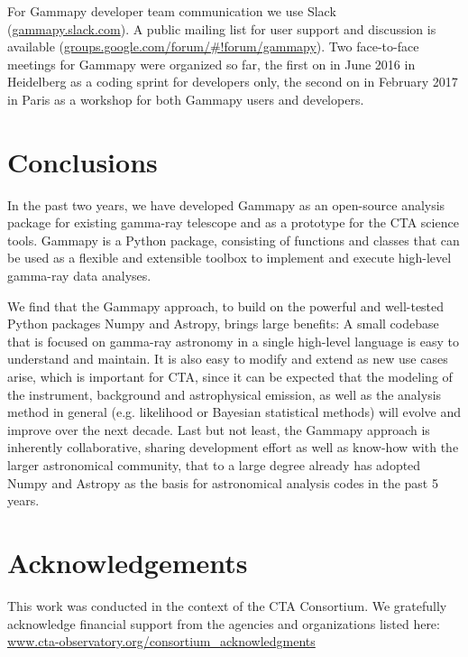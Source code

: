 \documentclass{PoS}
\newcommand{\urlGammapySlack}{\href{https://gammapy.slack.com}{gammapy.slack.com}}
\newcommand{\urlGammapyForum}{\href{https://groups.google.com/forum/\#!forum/gammapy}{groups.google.com/forum/\#!forum/gammapy}}
\newcommand{\urlCtaAck}{\href{http://www.cta-observatory.org/consortium_acknowledgments}{www.cta-observatory.org/consortium\_acknowledgments}}
\begin{document}
For Gammapy developer team communication we use Slack (\urlGammapySlack). A
public mailing list for user support and discussion is available
(\urlGammapyForum). Two face-to-face meetings for Gammapy were organized so far,
the first on in June 2016 in Heidelberg as a coding sprint for developers only,
the second on in February 2017 in Paris as a workshop for both Gammapy users and
developers.


\section{Conclusions}
\label{sec:conclusions}

In the past two years, we have developed Gammapy as an open-source analysis
package for existing gamma-ray telescope and as a prototype for the CTA science
tools. Gammapy is a Python package, consisting of functions and classes that can
be used as a flexible and extensible toolbox to implement and execute high-level
gamma-ray data analyses.

We find that the Gammapy approach, to build on the powerful and well-tested
Python packages Numpy and Astropy, brings large benefits: A small codebase that
is focused on gamma-ray astronomy in a single high-level language is easy to
understand and maintain. It is also easy to modify and extend as new use cases
arise, which is important for CTA, since it can be expected that the modeling of
the instrument, background and astrophysical emission, as well as the analysis
method in general (e.g. likelihood or Bayesian statistical methods) will evolve
and improve over the next decade. Last but not least, the Gammapy approach is
inherently collaborative, sharing development effort as well as know-how with
the larger astronomical community, that to a large degree already has adopted
Numpy and Astropy as the basis for astronomical analysis codes in the past 5
years.

\section{Acknowledgements}
\label{sed:acknowledgements}

This work was conducted in the context of the CTA Consortium. We gratefully
acknowledge financial support from the agencies and organizations listed here:\\
\urlCtaAck
\end{document}
